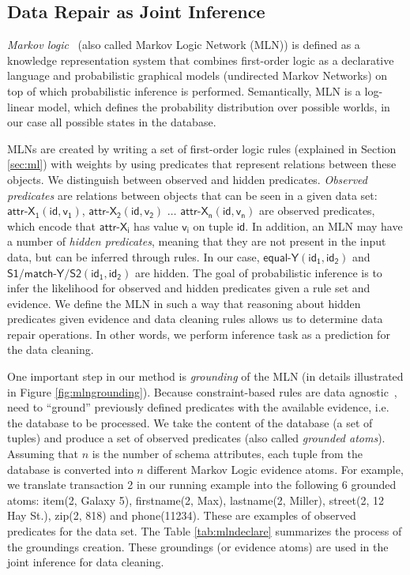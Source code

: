 \subsection{Data Repair as Joint Inference}
\label{subsec:jointinference}
\textit{Markov logic}~\cite{domingos2009markov} (also called Markov Logic Network (MLN)) is defined as a knowledge representation system that combines first-order logic as a declarative language and probabilistic graphical models (undirected Markov Networks) on top of which probabilistic inference is performed. Semantically, MLN is a log-linear model, which defines the probability distribution over possible worlds, in our case all possible states in the database.

MLNs are created by writing a set of first-order logic rules (explained in Section \ref{sec:ml}) with weights by using predicates that represent relations between these objects. We distinguish between observed and hidden predicates. \textit{Observed predicates} are relations between objects that can be seen in a given data set: $\mathsf{\textsf{attr-X}_1(id,v_1)}$, $\mathsf{\textsf{attr-X}_2(id,v_2)}$ $\dots$ $\mathsf{\textsf{attr-X}_n(id,v_n)}$ are observed predicates, which encode that $\mathsf{\textsf{attr-X}_i}$ has value $\mathsf{v_i}$ on tuple $\mathsf{id}$. In addition, an MLN may have a number of \textit{hidden predicates}, meaning that they are not present in the input data, but can be inferred through rules. In our case, $\mathsf{\textsf{equal-Y}(id_1, id_2)}$ and $\mathsf{\textsf{S1/match-Y/S2}(id_1, id_2)}$ are hidden.  The goal of probabilistic inference is to infer the likelihood for observed and hidden predicates given a rule set and evidence. We define the MLN in such a way that reasoning about hidden predicates given evidence and data cleaning rules allows us to determine data repair operations. In other words, we perform inference task as a prediction for the data cleaning.

One important step in our method is \textit{grounding} of the MLN (in details illustrated in Figure \ref{fig:mlngrounding}). Because constraint-based rules are data agnostic~\cite{fan2012foundations}, need to ``ground'' previously defined predicates with the available evidence, i.e. the database to be processed. We take the content of the database (a set of tuples) and produce a set of observed predicates (also called \textit{grounded atoms}). Assuming that $n$ is the number of schema attributes, each tuple from the database is converted into $n$ different Markov Logic evidence atoms. For example, we translate transaction 2 in our running example into the following 6 grounded atoms: \textsf{item}(2, Galaxy 5), \textsf{firstname}(2, Max), \textsf{lastname}(2, Miller), \textsf{street}(2, 12 Hay St.), \textsf{zip}(2, 818) and \textsf{phone}(11234). These are examples of observed predicates for the data set. The Table \ref{tab:mlndeclare} summarizes the process of the groundings creation. These groundings (or evidence atoms) are used in the joint inference for data cleaning. 


